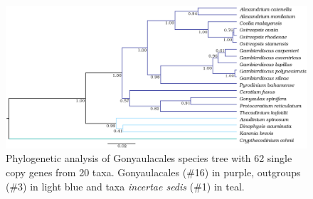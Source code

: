 \documentclass[12pt]{article}
\begin{document}
\begin{figure} 
\includegraphics[scale=.25]{figures/Aug2_20-taxa-combined-fig_MCC_trees.png} 
\caption{Phylogenetic analysis of Gonyaulacales species tree with 62 single copy genes from 20 taxa. Gonyaulacales (\#16) in purple, outgroups (\#3) in light blue and taxa \textit{incertae sedis} (\#1) in teal.} 
\label{fig:SCmscBI}
\end{figure} 
\FloatBarrier

\newpage
\end{document}
